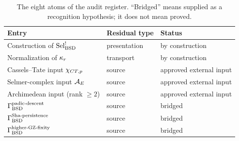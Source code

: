 \begin{table}[tbp]
\centering
\small
\caption{The eight atoms of the audit register.  ``Bridged'' means
supplied as a recognition hypothesis; it does not mean proved.}
\label{tab:aor-discharge-register}
\begin{tabularx}{\textwidth}{@{}>{\raggedright\arraybackslash}p{}
>{\raggedright\arraybackslash}p{}
>{\raggedright\arraybackslash}X@{}}
\toprule
Entry & Residual type & Status \\
\midrule
Construction of \(\mathrm{Sel}^{!}_{\mathrm{BSD}}\) & presentation & by construction \\
Normalization of \(\kappa_r\) & transport & by construction \\
Cassels--Tate input \(\chi_{CT,p}\) & source & approved external input \\
Selmer-complex input \(\mathcal{A}_E\) & source & approved external input \\
Archimedean input (rank \(\ge2\)) & source & approved external input \\
\(\Gamma_{\mathrm{BSD}}^{\mathrm{padic\text{-}descent}}\) & source & bridged \\
\(\Gamma_{\mathrm{BSD}}^{\mathrm{Sha\text{-}persistence}}\) & source & bridged \\
\(\Gamma_{\mathrm{BSD}}^{\mathrm{higher\text{-}GZ\text{-}fixity}}\) & source & bridged \\
\bottomrule
\end{tabularx}
\end{table}
